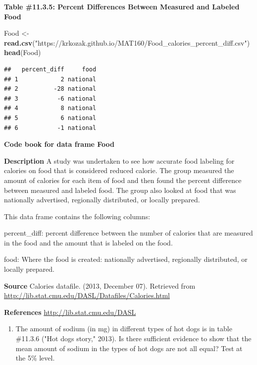 \documentclass[]{book}
\newenvironment{Shaded}{\begin{snugshade}}{\end{snugshade}}
\newcommand{\KeywordTok}[1]{\textcolor[rgb]{0.13,0.29,0.53}{\textbf{#1}}}
\newcommand{\NormalTok}[1]{#1}
\newcommand{\StringTok}[1]{\textcolor[rgb]{0.31,0.60,0.02}{#1}}
\providecommand{\tightlist}{%
  \setlength{\itemsep}{0pt}\setlength{\parskip}{0pt}}
\begin{document}
\textbf{Table \#11.3.5: Percent Differences Between Measured and Labeled Food}

\begin{Shaded}
\begin{Highlighting}[]
\NormalTok{Food <-}\StringTok{ }\KeywordTok{read.csv}\NormalTok{(}\StringTok{"https://krkozak.github.io/MAT160/Food_calories_percent_diff.csv"}\NormalTok{)}
\KeywordTok{head}\NormalTok{(Food)}
\end{Highlighting}
\end{Shaded}

\begin{verbatim}
##   percent_diff     food
## 1            2 national
## 2          -28 national
## 3           -6 national
## 4            8 national
## 5            6 national
## 6           -1 national
\end{verbatim}

\textbf{Code book for data frame Food}

\textbf{Description}
A study was undertaken to see how accurate food labeling for calories on food that is considered reduced calorie. The group measured the amount of calories for each item of food and then found the percent difference between measured and labeled food. The group also looked at food that was nationally advertised, regionally distributed, or locally prepared.

This data frame contains the following columns:

percent\_diff: percent difference between the number of calories that are measured in the food and the amount that is labeled on the food.

food: Where the food is created: nationally advertised, regionally distributed, or locally prepared.

\textbf{Source}
Calories datafile. (2013, December 07). Retrieved from \url{http://lib.stat.cmu.edu/DASL/Datafiles/Calories.html}

\textbf{References}
\url{http://lib.stat.cmu.edu/DASL}

\begin{enumerate}
\def\labelenumi{\arabic{enumi}.}
\setcounter{enumi}{4}
\tightlist
\item
  The amount of sodium (in mg) in different types of hot dogs is in table \#11.3.6 ("Hot dogs story," 2013). Is there sufficient evidence to show that the mean amount of sodium in the types of hot dogs are not all equal? Test at the 5\% level.
\end{enumerate}
\end{document}
